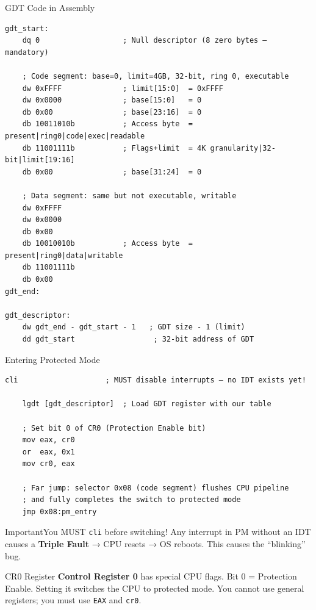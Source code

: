 \documentclass[aspectratio=169]{beamer}
\newcommand{\concept}[2]{%
  \begin{block}{#1}\smallskip #2\smallskip\end{block}\vspace{5pt}}
\newcommand{\warn}[1]{%
  \begin{alertblock}{Important}\smallskip #1\smallskip\end{alertblock}\vspace{5pt}}
\begin{document}
\begin{frame}[fragile]{GDT Code in Assembly}
  \begin{lstlisting}[style=asm]
gdt_start:
    dq 0                   ; Null descriptor (8 zero bytes — mandatory)

    ; Code segment: base=0, limit=4GB, 32-bit, ring 0, executable
    dw 0xFFFF              ; limit[15:0]  = 0xFFFF
    dw 0x0000              ; base[15:0]   = 0
    db 0x00                ; base[23:16]  = 0
    db 10011010b           ; Access byte  = present|ring0|code|exec|readable
    db 11001111b           ; Flags+limit  = 4K granularity|32-bit|limit[19:16]
    db 0x00                ; base[31:24]  = 0

    ; Data segment: same but not executable, writable
    dw 0xFFFF
    dw 0x0000
    db 0x00
    db 10010010b           ; Access byte  = present|ring0|data|writable
    db 11001111b
    db 0x00
gdt_end:

gdt_descriptor:
    dw gdt_end - gdt_start - 1   ; GDT size - 1 (limit)
    dd gdt_start                  ; 32-bit address of GDT
  \end{lstlisting}
\end{frame}

\begin{frame}[fragile]{Entering Protected Mode}
  \begin{lstlisting}[style=asm]
    cli                    ; MUST disable interrupts — no IDT exists yet!

    lgdt [gdt_descriptor]  ; Load GDT register with our table

    ; Set bit 0 of CR0 (Protection Enable bit)
    mov eax, cr0
    or  eax, 0x1
    mov cr0, eax

    ; Far jump: selector 0x08 (code segment) flushes CPU pipeline
    ; and fully completes the switch to protected mode
    jmp 0x08:pm_entry
  \end{lstlisting}
  \vspace{4pt}
  \warn{You MUST \texttt{cli} before switching! Any interrupt in PM without an IDT causes a \textbf{Triple Fault} → CPU resets → OS reboots. This causes the ``blinking'' bug.}
  \vspace{4pt}
  \concept{CR0 Register}{
    \textbf{Control Register 0} has special CPU flags. Bit 0 = Protection Enable. Setting it switches the CPU to protected mode. You cannot use general registers; you must use \texttt{EAX} and \texttt{cr0}.
  }
\end{frame}
\end{document}
